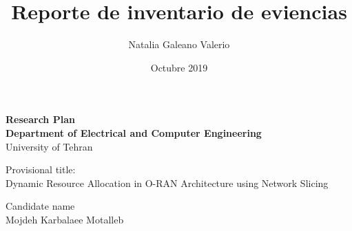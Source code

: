 \documentclass{article}
\title{Reporte de inventario de eviencias}
\author{Natalia Galeano Valerio}
\date{Octubre 2019}
\begin{document}
\baselineskip 12pt

\vspace*{30mm}

\begin{center}

\textbf{\Large Research Plan} \\
\vspace{10mm}
\textbf{Department of Electrical and Computer Engineering}\\
\vspace{20mm}
{\large University of Tehran}\\
\vspace{20mm}
\end{center}
\vspace{10mm}
{\scriptsize Provisional title:}\\
Dynamic Resource Allocation in O-RAN Architecture using Network Slicing\\

\vspace{20mm}

{\scriptsize Candidate name}\\
Mojdeh Karbalaee Motalleb \\
\vspace{3mm}



\vspace{3mm}
\end{document}
